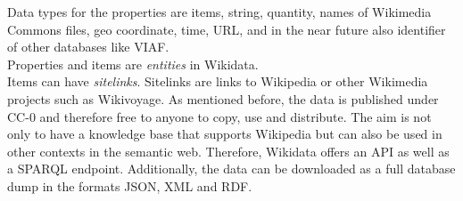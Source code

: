 Data types for the properties are items, string, quantity, names of Wikimedia Commons files, geo coordinate, time, URL,  and in the near future also identifier of other databases like VIAF. \\
Properties and items are \textit{entities} in Wikidata. \\
Items can have \textit{sitelinks}. Sitelinks are links to Wikipedia or other Wikimedia projects such as Wikivoyage.
As mentioned before, the data is published under CC-0 and therefore free to anyone to copy, use and distribute.
The aim is not only to have a knowledge base that supports Wikipedia but can also be used in other contexts in the semantic web. Therefore, Wikidata offers an API as well as a SPARQL endpoint. Additionally, the data can be downloaded as a full database dump in the formats JSON, XML and RDF. 
